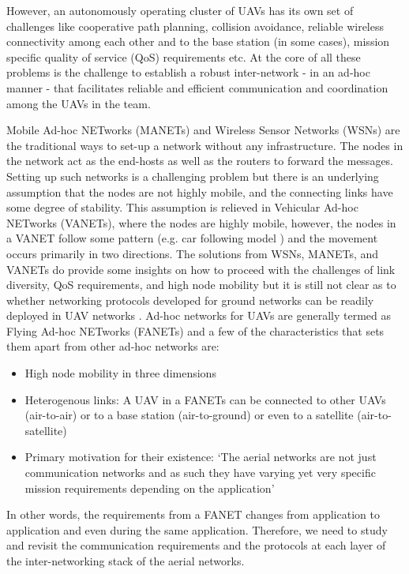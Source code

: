 However, an autonomously operating cluster of UAVs has its own set of challenges like cooperative path planning, collision avoidance, reliable wireless connectivity among each other and to the base station (in some cases), mission specific quality of service (QoS) requirements etc. At the core of all these problems is the challenge to establish a robust inter-network - in an ad-hoc manner - that facilitates reliable and efficient communication and coordination among the UAVs in the team. 

Mobile Ad-hoc NETworks (MANETs) and Wireless Sensor Networks (WSNs) are the traditional ways to set-up a network without any infrastructure. The nodes in the network act as the end-hosts as well as the routers to forward the messages. Setting up such networks is a challenging problem but there is an underlying assumption that the nodes are not highly mobile, and the connecting links have some degree of stability. This assumption is relieved in Vehicular Ad-hoc NETworks (VANETs), where the nodes are highly mobile, however, the nodes in a VANET follow some pattern (e.g. car following model \cite{rothery1992car}) and the movement occurs primarily in two directions. The solutions from WSNs, MANETs, and VANETs do provide some insights on how to proceed with the challenges of link diversity, QoS requirements, and high node mobility but it is still not clear as to whether networking protocols developed for ground networks can be readily deployed in UAV networks \cite{7463007}. 
Ad-hoc networks for UAVs are generally termed as Flying Ad-hoc NETworks (FANETs) and a few of the characteristics that sets them apart from other ad-hoc networks are:
\begin{itemize}
    \item High node mobility in three dimensions 
    \item Heterogenous links: A UAV in a FANETs can be connected to other UAVs (air-to-air) or to a base station (air-to-ground) or even to a satellite (air-to-satellite)
    \item Primary motivation for their existence: `The aerial networks are not just communication networks and as such they have varying yet very specific mission requirements depending on the application' \cite{7463007}
\end{itemize}  

In other words, the requirements from a FANET changes from application to application and even during the same application. Therefore, we need to study and revisit the communication requirements and the protocols at each layer of the inter-networking stack of the aerial networks.

